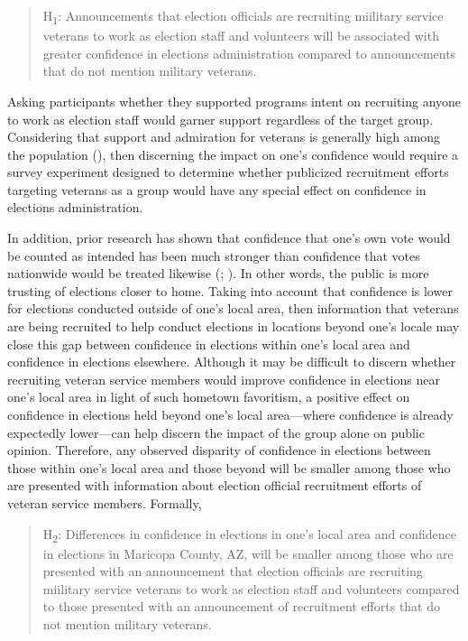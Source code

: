 \documentclass[
  12pt,
  letterpaper,
]{article}
\begin{document}
\begin{quote}
H\textsubscript{1}: Announcements that election officials are recruiting
miilitary service veterans to work as election staff and volunteers will
be associated with greater confidence in elections administration
compared to announcements that do not mention military veterans.
\end{quote}

Asking participants whether they supported programs intent on recruiting
anyone to work as election staff would garner support regardless of the
target group. Considering that support and admiration for veterans is
generally high among the population
(), then
discerning the impact on one's confidence would require a survey
experiment designed to determine whether publicized recruitment efforts
targeting veterans as a group would have any special effect on
confidence in elections administration.

In addition, prior research has shown that confidence that one's own
vote would be counted as intended has been much stronger than confidence
that votes nationwide would be treated likewise
(;
). In other words, the public is
more trusting of elections closer to home. Taking into account that
confidence is lower for elections conducted outside of one's local area,
then information that veterans are being recruited to help conduct
elections in locations beyond one's locale may close this gap between
confidence in elections within one's local area and confidence in
elections elsewhere. Although it may be difficult to discern whether
recruiting veteran service members would improve confidence in elections
near one's local area in light of such hometown favoritism, a positive
effect on confidence in elections held beyond one's local area---where
confidence is already expectedly lower---can help discern the impact of
the group alone on public opinion. Therefore, any observed disparity of
confidence in elections between those within one's local area and those
beyond will be smaller among those who are presented with information
about election official recruitment efforts of veteran service members.
Formally,

\begin{quote}
H\textsubscript{2}: Differences in confidence in elections in one's
local area and confidence in elections in Maricopa County, AZ, will be
smaller among those who are presented with an announcement that election
officials are recruiting miilitary service veterans to work as election
staff and volunteers compared to those presented with an announcement of
recruitment efforts that do not mention military veterans.
\end{quote}
\end{document}
